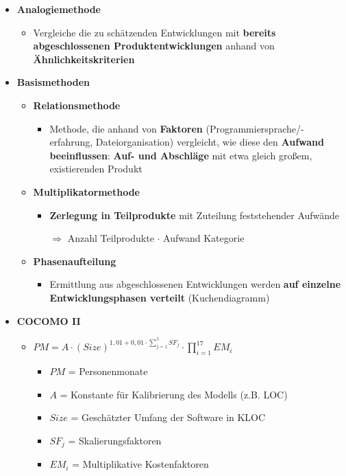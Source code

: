 \documentclass[parskip=full, 12pt]{scrartcl}
\begin{document}
			\begin{itemize}
				\item \textbf{Analogiemethode}
				\begin{itemize}
					\item Vergleiche die zu schätzenden Entwicklungen mit \textbf{bereits abgeschlossenen Produktentwicklungen} anhand von \textbf{Ähnlichkeitskriterien}
				\end{itemize}
				\item \textbf{\textbf{Basismethoden}}
				\begin{itemize}
					\item \textbf{Relationsmethode}
					\begin{itemize}
						\item Methode, die anhand von \textbf{Faktoren} (Programmiersprache/-erfahrung, Dateiorganisation) vergleicht, wie diese den \textbf{Aufwand beeinflussen}: \textbf{Auf- und Abschläge} mit etwa gleich großem, existierenden Produkt
					\end{itemize}
					\item \textbf{Multiplikatormethode}
					\begin{itemize}
						\item \textbf{Zerlegung in Teilprodukte} mit Zuteilung feststehender Aufwände
						
						$\Rightarrow$ Anzahl Teilprodukte {\Large $\cdot$} Aufwand Kategorie
					\end{itemize}
					\item \textbf{Phasenaufteilung}
					\begin{itemize}
						\item Ermittlung aus abgeschlossenen Entwicklungen werden \textbf{auf einzelne Entwicklungsphasen verteilt} (Kuchendiagramm)
					\end{itemize}
				\end{itemize}
				\item \textbf{COCOMO II}
				\begin{itemize}
					\item {\LARGE $PM = A \cdot (Size)^{1,01 + 0,01 \cdot {\sum_{j=1}^{5} SF_{j}}} \cdot \prod_{i=1}^{17} EM_{i}$}
					\begin{itemize}
						\item $PM$ = Personenmonate
						\item $A$ = Konstante für Kalibrierung des Modells (z.B. LOC)
						\item $Size$ = Geschätzter Umfang der Software in KLOC
						\item $SF_{j}$ = Skalierungsfaktoren
						\item $EM_{i}$ = Multiplikative Kostenfaktoren
					\end{itemize}
				\end{itemize}
			\end{itemize}
	
\end{document}
